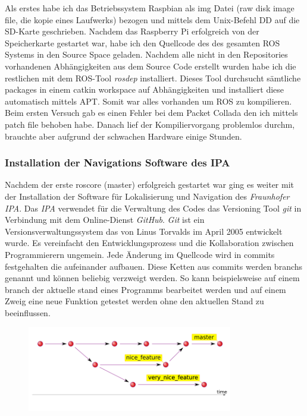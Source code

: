 Als erstes habe ich das Betriebssystem Raspbian als img Datei (raw disk image file, die kopie eines Laufwerks) bezogen und mittels dem Unix-Befehl DD auf die SD-Karte geschrieben. Nachdem das Raspberry Pi erfolgreich von der Speicherkarte gestartet war, habe ich den Quellcode des des gesamten ROS Systems in den Source Space geladen. Nachdem alle nicht in den Repositories vorhandenen Abhängigkeiten aus dem Source Code erstellt wurden habe ich die restlichen mit dem ROS-Tool \emph{rosdep} installiert. Dieses Tool durchsucht sämtliche \Glspl{package} in einem \Gls{catkin workspace} auf Abhängigkeiten und installiert diese automatisch mittels APT.
Somit war alles vorhanden um ROS zu kompilieren. Beim ersten Versuch gab es einen Fehler bei dem Packet Collada den ich mittels \Gls{patch file} behoben habe. 
Danach lief der Kompiliervorgang problemlos durchm, brauchte aber aufgrund der schwachen Hardware einige Stunden.

\subsubsection{Installation der Navigations Software des IPA}

Nachdem der erste roscore (\Gls{master}) erfolgreich gestartet war ging es weiter mit der Installation der Software für Lokalisierung und Navigation des \emph{Fraunhofer IPA}.
Das \emph{IPA} verwendet für die Verwaltung des Codes das Versioning Tool \emph{git} in Verbindung mit dem Online-Dienst \emph{GitHub}. 
\emph{Git} ist ein Versionsverwaltungssystem das von Linus Torvalds im April 2005 entwickelt wurde. Es vereinfacht den Entwicklungsprozess und die Kollaboration zwischen Programmierern ungemein. Jede Änderung im Quellcode wird in \Glspl{commit} festgehalten die aufeinander aufbauen. Diese Ketten aus \Glspl{commit} werden \Glspl{branch} genannt und können beliebig verzweigt werden. So kann beispielsweise auf einem \Gls{branch} der aktuelle stand eines Programms bearbeitet werden und auf einem Zweig eine neue Funktion getestet werden ohne den aktuellen Stand zu beeinflussen.

\begin{figure}[ht]
\begin{center}
\includegraphics[width=0.8\textwidth]{git-branches}
  \label{git branches}
\end{center}
\end{figure}

